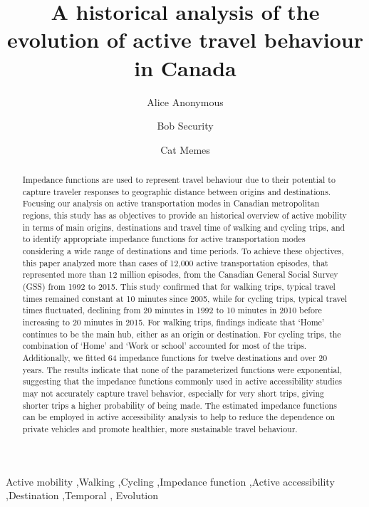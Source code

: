 \documentclass[preprint, 3p,
authoryear]{elsarticle} %
\begin{document}
\begin{frontmatter}

  \title{A historical analysis of the evolution of active travel
behaviour in Canada}
    \author[Some Institute of Technology]{Alice Anonymous%
  }
    \author[Some Institute of Technology]{Bob Security%
  }
    \author[Some Institute of Technology]{Cat Memes%
  }
  
  \begin{abstract}
  Impedance functions are used to represent travel behaviour due to
  their potential to capture traveler responses to geographic distance
  between origins and destinations. Focusing our analysis on active
  transportation modes in Canadian metropolitan regions, this study has
  as objectives to provide an historical overview of active mobility in
  terms of main origins, destinations and travel time of walking and
  cycling trips, and to identify appropriate impedance functions for
  active transportation modes considering a wide range of destinations
  and time periods. To achieve these objectives, this paper analyzed
  more than cases of 12,000 active transportation episodes, that
  represented more than 12 million episodes, from the Canadian General
  Social Survey (GSS) from 1992 to 2015. This study confirmed that for
  walking trips, typical travel times remained constant at 10 minutes
  since 2005, while for cycling trips, typical travel times fluctuated,
  declining from 20 minutes in 1992 to 10 minutes in 2010 before
  increasing to 20 minutes in 2015. For walking trips, findings indicate
  that `Home' continues to be the main hub, either as an origin or
  destination. For cycling trips, the combination of `Home' and `Work or
  school' accounted for most of the trips. Additionally, we fitted 64
  impedance functions for twelve destinations and over 20 years. The
  results indicate that none of the parameterized functions were
  exponential, suggesting that the impedance functions commonly used in
  active accessibility studies may not accurately capture travel
  behavior, especially for very short trips, giving shorter trips a
  higher probability of being made. The estimated impedance functions
  can be employed in active accessibility analysis to help to reduce the
  dependence on private vehicles and promote healthier, more sustainable
  travel behaviour.
  \end{abstract}
    \begin{keyword}
    Active mobility \sep Walking \sep Cycling \sep Impedance
function \sep Active accessibility \sep Destination \sep Temporal \sep 
    Evolution
  \end{keyword}
  
 \end{frontmatter}
\end{document}
